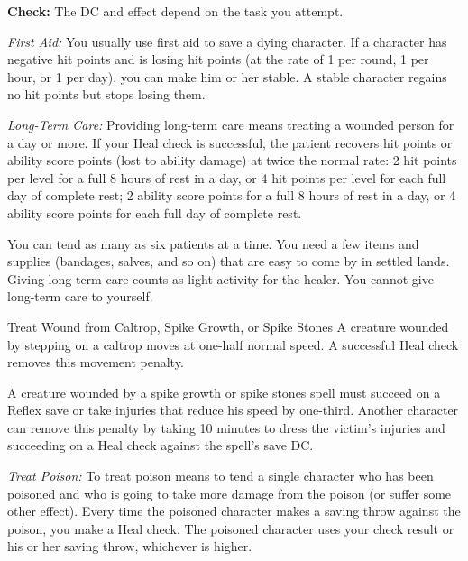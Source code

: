 \textbf{Check:} The DC and effect depend on the task you attempt.


\textit{First Aid:} You usually use first aid to save a dying character. If a character has negative hit points and is losing hit points (at the rate of 1 per round, 1 per hour, or 1 per day), you can make him or her stable. A stable character regains no hit points but stops losing them.

\textit{Long-Term Care:} Providing long-term care means treating a wounded person for a day or more. If your Heal check is successful, the patient recovers hit points or ability score points (lost to ability damage) at twice the normal rate: 2 hit points per level for a full 8 hours of rest in a day, or 4 hit points per level for each full day of complete rest; 2 ability score points for a full 8 hours of rest in a day, or 4 ability score points for each full day of complete rest.

You can tend as many as six patients at a time. You need a few items and supplies (bandages, salves, and so on) that are easy to come by in settled lands. Giving long-term care counts as light activity for the healer. You cannot give long-term care to yourself.

Treat Wound from Caltrop, Spike Growth, or Spike Stones
A creature wounded by stepping on a caltrop moves at one-half normal speed. A successful Heal check removes this movement penalty.

A creature wounded by a spike growth or spike stones spell must succeed on a Reflex save or take injuries that reduce his speed by one-third. Another character can remove this penalty by taking 10 minutes to dress the victim's injuries and succeeding on a Heal check against the spell's save DC.

\textit{Treat Poison:} To treat poison means to tend a single character who has been poisoned and who is going to take more damage from the poison (or suffer some other effect). Every time the poisoned character makes a saving throw against the poison, you make a Heal check. The poisoned character uses your check result or his or her saving throw, whichever is higher.

